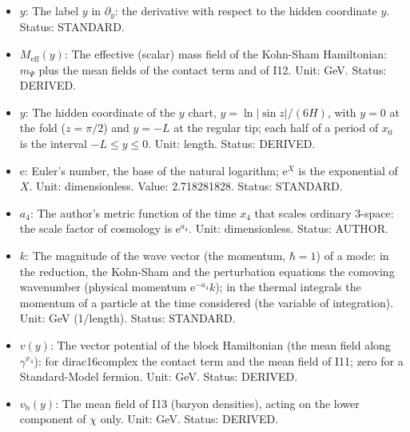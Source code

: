 \documentclass[
  10pt,
]{article}
\begin{document}
\begin{itemize}
\item
  \(y\): The label \(y\) in \(\partial_y\): the derivative with respect
  to the hidden coordinate \(y\). Status: STANDARD.
\item
  \(M_{\mathrm{eff}}(y)\): The effective (scalar) mass field of the
  Kohn-Sham Hamiltonian: \(m_\Psi\) plus the mean fields of the contact
  term and of I12. Unit: GeV. Status: DERIVED.
\item
  \(y\): The hidden coordinate of the \(y\) chart,
  \(y = \ln\lvert\sin z\rvert/(6H)\), with \(y = 0\) at the fold
  (\(z = \pi/2\)) and \(y = -L\) at the regular tip; each half of a
  period of \(x_0\) is the interval \(-L \le y \le 0\). Unit: length.
  Status: DERIVED.
\item
  \(\mathrm{e}\): Euler's number, the base of the natural logarithm;
  \(\mathrm{e}^{X}\) is the exponential of \(X\). Unit: dimensionless.
  Value: 2.718281828. Status: STANDARD.
\item
  \(a_4\): The author's metric function of the time \(x_4\) that scales
  ordinary 3-space: the scale factor of cosmology is
  \(\mathrm{e}^{a_4}\). Unit: dimensionless. Status: AUTHOR.
\item
  \(k\): The magnitude of the wave vector (the momentum, \(\hbar = 1\))
  of a mode: in the reduction, the Kohn-Sham and the perturbation
  equations the comoving wavenumber (physical momentum
  \(\mathrm{e}^{-a_4}k\)); in the thermal integrals the momentum of a
  particle at the time considered (the variable of integration). Unit:
  GeV (1/length). Status: STANDARD.
\item
  \(v(y)\): The vector potential of the block Hamiltonian (the mean
  field along \(\gamma^{x_4}\)): for dirac16complex the contact term and
  the mean field of I11; zero for a Standard-Model fermion. Unit: GeV.
  Status: DERIVED.
\item
  \(v_{\mathrm{b}}(y)\): The mean field of I13 (baryon densities),
  acting on the lower component of \(\chi\) only. Unit: GeV. Status:
  DERIVED.
\end{itemize}
\end{document}
